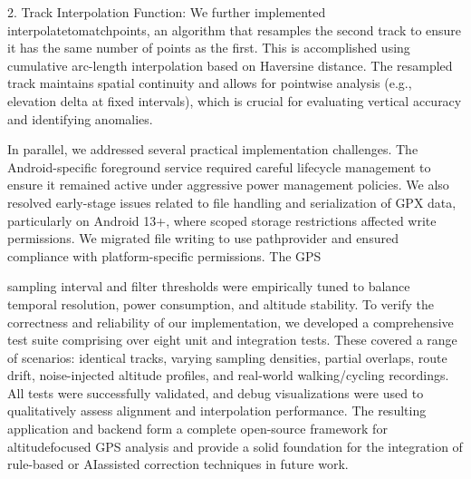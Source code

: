 \documentclass[12pt]{article}
\begin{document}
2. Track Interpolation Function:
We further implemented interpolatetomatchpoints, an algorithm that resamples
the second track to ensure it has the same number of points as the first. This is
accomplished using cumulative arc-length interpolation based on Haversine distance.
The resampled track maintains spatial continuity and allows for pointwise analysis
(e.g., elevation delta at fixed intervals), which is crucial for evaluating vertical
accuracy and identifying anomalies.

In parallel, we addressed several practical implementation challenges. The Android-specific
foreground service required careful lifecycle management to ensure it remained active
under aggressive power management policies. We also resolved early-stage issues related to
file handling and serialization of GPX data, particularly on Android 13+, where scoped
storage restrictions affected write permissions. We migrated file writing to use
pathprovider and ensured compliance with platform-specific permissions. The GPS 

sampling interval and filter thresholds were empirically tuned to balance temporal
resolution, power consumption, and altitude stability.
To verify the correctness and reliability of our implementation, we developed a
comprehensive test suite comprising over eight unit and integration tests. These covered a
range of scenarios: identical tracks, varying sampling densities, partial overlaps, route drift,
noise-injected altitude profiles, and real-world walking/cycling recordings. All tests were
successfully validated, and debug visualizations were used to qualitatively assess alignment
and interpolation performance.
The resulting application and backend form a complete open-source framework for altitudefocused GPS analysis and provide a solid foundation for the integration of rule-based or AIassisted correction techniques in future work.

\newpage
\end{document}
